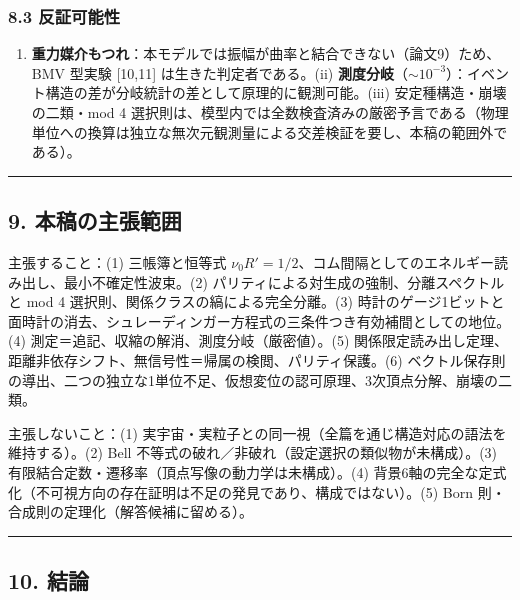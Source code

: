 \documentclass[
]{ltjsarticle}
\providecommand{\tightlist}{%
  \setlength{\itemsep}{0pt}\setlength{\parskip}{0pt}}
\begin{document}
\subsubsection{8.3 反証可能性}\label{ux53cdux8a3cux53efux80fdux6027}

\begin{enumerate}
\def\labelenumi{(\roman{enumi})}
\tightlist
\item
  \textbf{重力媒介もつれ}：本モデルでは振幅が曲率と結合できない（論文9）ため、BMV
  型実験 {[}10,11{]} は生きた判定者である。(ii)
  \textbf{測度分岐}（\(\sim10^{-3}\)）：イベント構造の差が分岐統計の差として原理的に観測可能。(iii)
  安定種構造・崩壊の二類・mod 4
  選択則は、模型内では全数検査済みの厳密予言である（物理単位への換算は独立な無次元観測量による交差検証を要し、本稿の範囲外である）。
\end{enumerate}

\begin{center}\rule{0.5\linewidth}{0.5pt}\end{center}

\subsection{9.
本稿の主張範囲}\label{ux672cux7a3fux306eux4e3bux5f35ux7bc4ux56f2}

主張すること：(1) 三帳簿と恒等式
\(\nu_0R'=1/2\)、コム間隔としてのエネルギー読み出し、最小不確定性波束。(2)
パリティによる対生成の強制、分離スペクトルと mod 4
選択則、関係クラスの縞による完全分離。(3)
時計のゲージ1ビットと面時計の消去、シュレーディンガー方程式の三条件つき有効補間としての地位。(4)
測定＝追記、収縮の解消、測度分岐（厳密値）。(5)
関係限定読み出し定理、距離非依存シフト、無信号性＝帰属の検閲、パリティ保護。(6)
ベクトル保存則の導出、二つの独立な1単位不足、仮想変位の認可原理、3次頂点分解、崩壊の二類。

主張しないこと：(1)
実宇宙・実粒子との同一視（全篇を通じ構造対応の語法を維持する）。(2) Bell
不等式の破れ／非破れ（設定選択の類似物が未構成）。(3)
有限結合定数・遷移率（頂点写像の動力学は未構成）。(4)
背景6軸の完全な定式化（不可視方向の存在証明は不足の発見であり、構成ではない）。(5)
Born 則・合成則の定理化（解答候補に留める）。

\begin{center}\rule{0.5\linewidth}{0.5pt}\end{center}

\subsection{10. 結論}\label{ux7d50ux8ad6}
\end{document}
